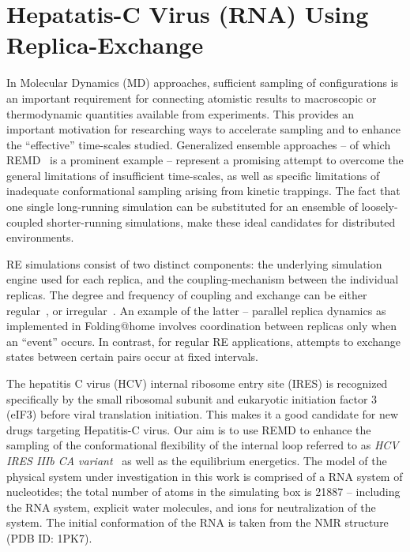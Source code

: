 \documentclass{rspublic}
\begin{document}
\section{Hepatatis-C Virus (RNA) Using Replica-Exchange}

In Molecular Dynamics (MD) approaches, sufficient sampling of
configurations is an important requirement for connecting atomistic
results to macroscopic or thermodynamic quantities available from
experiments. This provides an important motivation for researching ways 
to accelerate sampling and to enhance the ``effective''
time-scales studied. 
Generalized ensemble approaches -- of which
REMD~\citep{Sugita:1999rm} is a prominent example -- represent a
promising attempt to overcome the general limitations of
insufficient time-scales, as well as specific limitations of
inadequate conformational sampling arising from kinetic trappings.
The fact that one single long-running simulation can be substituted
for an ensemble of loosely-coupled shorter-running simulations, make
these ideal candidates for distributed environments.

RE simulations consist of
two distinct components: the underlying simulation engine
used for each replica, and the coupling-mechanism between the
individual replicas.  
The degree and frequency of coupling and exchange can be either
regular~\citep{Sugita:1999rm}, or irregular~\citep{SPdynamics}. 
An example of the latter -- parallel replica dynamics as 
implemented in Folding@home
\citep{folding} involves coordination between replicas only when an
``event'' occurs.  In contrast, for regular RE applications, attempts
to exchange states between certain pairs occur at fixed intervals. 


The hepatitis C virus (HCV) internal ribosome entry site (IRES) is
recognized specifically by the small ribosomal subunit and eukaryotic
initiation factor 3 (eIF3) before viral translation initiation.  This
makes it a good candidate for new drugs targeting Hepatitis-C virus.
Our aim is to use REMD to enhance the sampling of the conformational
flexibility of the internal loop referred to as {\it HCV IRES IIIb CA
  variant}~\citep{Collier:2002wd} as well as the equilibrium
energetics.  The model of the physical system under investigation in
this work is comprised of a RNA system of nucleotides; the total
number of atoms in the simulating box is 21887 -- including the RNA
system, explicit water molecules, and ions for neutralization of the
system.  The initial conformation of the RNA is taken from the NMR
structure (PDB ID: 1PK7).
\end{document}
